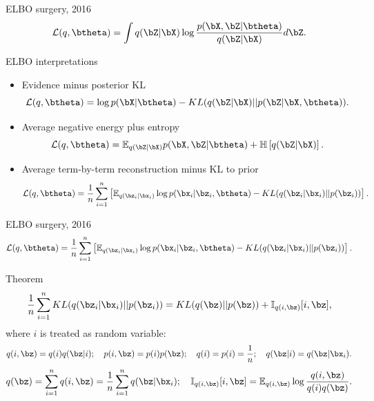 \begin{frame}{ELBO surgery, 2016}
		\[
			\mathcal{L} (q, \btheta)  = \int q(\bZ | \bX) \log \frac{p(\bX, \bZ | \btheta)}{q(\bZ | \bX)} d\bZ.
		\]
		\vspace{-0.1cm}
	\begin{block}{ELBO interpretations}
	\begin{itemize}
	    \item Evidence minus posterior KL
	    \vspace{-0.1cm}
	    \[
	        \mathcal{L}(q, \btheta) = \log p(\bX | \btheta) - KL(q(\bZ | \bX) || p(\bZ | \bX, \btheta)).
	    \]
	    \item Average negative energy plus entropy
	    \vspace{-0.1cm}
	    \[
	        \mathcal{L}(q, \btheta) = \mathbb{E}_{q(\bZ | \bX)} p(\bX, \bZ | \btheta) + \mathbb{H} \left[q(\bZ | \bX) \right].
	    \]
	    \item Average term-by-term reconstruction minus KL to prior
	    \vspace{-0.1cm}
	    \[
	        \mathcal{L}(q, \btheta) = \frac{1}{n} \sum_{i=1}^n \left[ \mathbb{E}_{q(\bz_i | \bx_i)} \log p(\bx_i | \bz_i, \btheta) - KL(q(\bz_i | \bx_i) || p(\bz_i)) \right].
	    \]
	\end{itemize}
	\end{block}
	
\end{frame}
\begin{frame}{ELBO surgery, 2016}
	\vspace{-0.3cm}
	\[
	    \mathcal{L}(q, \btheta) = \frac{1}{n} \sum_{i=1}^n \left[ \mathbb{E}_{q(\bz_i | \bx_i)} \log p(\bx_i | \bz_i, \btheta) - KL(q(\bz_i | \bx_i) || p(\bz_i)) \right].
	\]
	\vspace{-0.3cm}
	\begin{block}{Theorem}
	\[
	    \frac{1}{n} \sum_{i=1}^n KL(q(\bz_i | \bx_i) || p(\bz_i)) = KL(q(\bz) || p(\bz)) + \mathbb{I}_{q(i, \bz)} [i, \bz],
	\]
	where $i$ is treated as random variable:
	\footnotesize{
	\[
	    q(i, \bz) = q(i) q(\bz | i); \quad p(i, \bz) = p(i) p(\bz); \quad 
	    q(i) = p(i) = \frac{1}{n}; \quad q(\bz | i) = q(\bz | \bx_i).
	\]
	\[
	    q(\bz) = \sum_{i=1}^n q(i, \bz) = \frac{1}{n} \sum_{i=1}^n q(\bz | \bx_i); \quad  \mathbb{I}_{q(i, \bz)} [i, \bz] = \mathbb{E}_{q(i, \bz)} \log \frac{q(i, \bz)}{q(i)q(\bz)}.
	\]
	}
	\end{block}


\end{frame}
